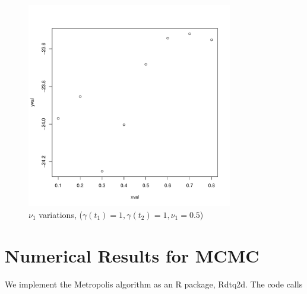 \documentclass[a4paper,11pt]{article}
\begin{document}
\begin{figure}[H]
\centering
\includegraphics[width=0.8\textwidth]{test2_nu2.pdf}
\caption{$\nu_1$ variations, ($\gamma(t_1) = 1, \gamma(t_2) = 1, \nu_1 = 0.5$)}
\end{figure}

\section{Numerical Results for MCMC}
We implement the Metropolis algorithm as an R package, Rdtq2d. The code calls 
\end{document}
